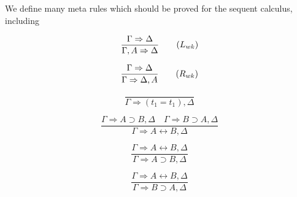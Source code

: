 \begin{definition}[MetaRules]\label{def:MetaRules}
We define many meta rules which should be proved for the sequent calculus, including
\begin{multicols}{2}
\[
\frac{\Gamma \Rightarrow \Delta}{\Gamma, A \Rightarrow \Delta} \tag{$L_{wk}$}
\]

\[
\frac{\Gamma \Rightarrow \Delta}{\Gamma \Rightarrow \Delta, A} \tag{$R_{wk}$}
\]

\[
\frac{}{\Gamma \Rightarrow (t_1 = t_1), \Delta} \tag{$R=$}
\]

\[
\frac{\Gamma \Rightarrow A \supset B, \Delta \quad \Gamma \Rightarrow B \supset A, \Delta}{\Gamma \Rightarrow A \leftrightarrow B, \Delta} \tag{$R\leftrightarrow$}
\]

\[
\frac{\Gamma \Rightarrow A \leftrightarrow B, \Delta}{\Gamma \Rightarrow A \supset B, \Delta} \tag{$R \leftrightarrow elim\_to\_right$}
\]

\[
\frac{\Gamma \Rightarrow A \leftrightarrow B, \Delta}{\Gamma \Rightarrow B \supset A, \Delta} \tag{$R \leftrightarrow elim\_to\_left$}
\]
\end{multicols}
\end{definition}



